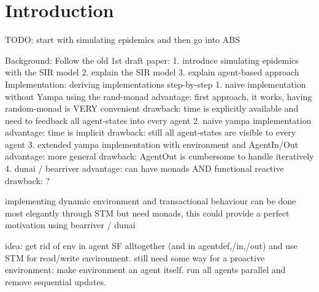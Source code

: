 \section{Introduction}
TODO: start with simulating epidemics and then go into ABS

Background: Follow the old 1st draft paper:
1. introduce simulating epidemics with the SIR model
2. explain the SIR model 
3. explain agent-based approach 
Implementation: deriving implementations step-by-step 
1. naive implementation without Yampa using the rand-monad 
	advantage: 	first approach, it works, having random-monad is VERY convenient
	drawback: 	time is explicitly available and need to feedback all agent-states into every agent
2. naive yampa implementation
	advantage:	time is implicit
	drawback:	still all agent-states are visible to every agent
3. extended yampa implementation with environment and AgentIn/Out
	advantage:	more general
	drawback:	AgentOut is cumbersome to handle iteratively
4. dunai / bearriver
	advantage:	can have monads AND functional reactive 
	drawback:	?
	
implementing dynamic environment and transactional behaviour can be done most elegantly through STM but need monads, this could provide a perfect motivation using bearriver / dunai 

idea: get rid of env in agent SF alltogether (and in agentdef,/in,/out) and use STM for read/write environment. still need some way for a proactive environment: make environment an agent itself. run all agents parallel and remove sequential updates.